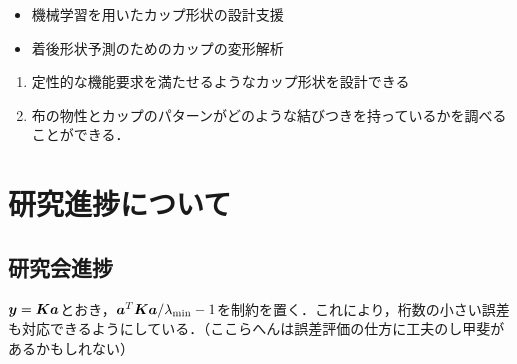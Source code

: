 \documentclass[11pt]{jsarticle}
\begin{document}
	\articleSPRabst
		\begin{itemize}
			\item 機械学習を用いたカップ形状の設計支援
			\item 着後形状予測のためのカップの変形解析
		\end{itemize}
		
		
	\articleSPRobj
		\begin{enumerate}
			\item 定性的な機能要求を満たせるようなカップ形状を設計できる
			\item 布の物性とカップのパターンがどのような結びつきを持っているかを調べることができる．
		\end{enumerate}
	\articleSPRitemsone
		
		\tableofcontents
		
		
	\articleSPRitemstwo
	\renewcommand{\labelitemi}{$\blacktriangledown$}
	\newcommand{\argmax}{\mathop{\rm arg~max}\limits}
	\newcommand{\argmin}{\mathop{\rm arg~min}\limits}
	\newcommand{\Ker}{{\rm Ker}}
	\newcommand{\rank}{{\rm rank}}
	\section{研究進捗について}
		\subsection{研究会進捗}
			$ \boldsymbol{y} = \boldsymbol{K}\boldsymbol{a} $とおき，$ \boldsymbol{a}^T \boldsymbol{K} \boldsymbol{a} / \lambda_{\min} - 1 $を制約を置く．これにより，桁数の小さい誤差も対応できるようにしている．（ここらへんは誤差評価の仕方に工夫のし甲斐があるかもしれない）
			
\end{document}
